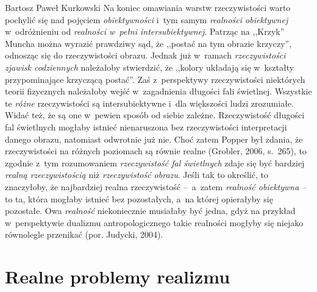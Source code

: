 \begin{artplenv}{Bartosz Paweł Kurkowski}
Na koniec omawiania warstw rzeczywistości warto pochylić się nad pojęciem \textit{obiektywności} i~tym samym
\textit{realności obiektywnej} w~odróżnieniu od \textit{realności w~pełni intersubiektywnej}. Patrząc na ,,Krzyk'' Muncha
można wyrazić prawdziwy sąd, że ,,postać na tym obrazie krzyczy'', odnosząc się do rzeczywistości obrazu. Jednak
już w~ramach \textit{rzeczywistości zjawisk codziennych} należałoby stwierdzić, że ,,kolory układają się w~kształty
przypominające krzyczącą postać''. Zaś z~perspektywy rzeczywistości niektórych teorii fizycznych należałoby
wejść w~zagadnienia długości fali świetlnej. Wszystkie te \textit{różne }rzeczywistości są intersubiektywne i~dla większości
ludzi zrozumiałe. Widać też, że są one w~pewien sposób od siebie zależne. Rzeczywistość długości fal świetlnych mogłaby
istnieć nienaruszona bez rzeczywistości interpretacji danego obrazu, natomiast odwrotnie już nie. Choć zatem Popper był
zdania, że rzeczywistości na różnych poziomach są równie realne \label{ref:RNDPFZg8cPhbT}(Grobler, 2006, s.~265), to
zgodnie z~tym rozumowaniem \textit{rzeczywistość fal świetlnych} zdaje się być bardziej \textit{realną rzeczywistością}
niż \textit{rzeczywistość obrazu}. Jeśli tak to określić, to znaczyłoby, że najbardziej realna
rzeczywistość --~a~zatem\textit{ realność obiektywna –} to ta, która mogłaby istnieć bez pozostałych, a~na której opierałyby się
pozostałe. Owa \textit{realność }niekoniecznie musiałaby być jedna, gdyż na przykład w~perspektywie dualizmu
antropologicznego takie realności mogłyby się niejako równolegle przenikać \label{ref:RND4mQxYRnPeH}(por. Judycki,
2004).

\section{Realne problemy realizmu}


\end{artplenv}
